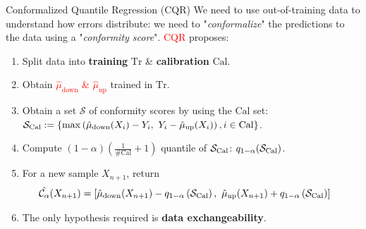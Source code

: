 \documentclass{beamer}
\newcommand{\Ca}{\mathcal{C}_{\alpha}}
\renewcommand{\S}{\mathcal{S}}
\renewcommand{\a}{\alpha}
\begin{document}
\begin{frame}{Conformalized Quantile Regression (CQR)}
    We need to use out-of-training data to understand how errors distribute: we need to "\textit{conformalize}" the predictions to the data using a "\textit{conformity score}".  \textcolor{red}{CQR} proposes:
    \begin{enumerate}
        \item Split data into \textbf{training} $\mathrm{Tr}$ \& \textbf{calibration} $\mathrm{Cal}$.
        \item Obtain \cancel{$\Hat{\mu}$} \textcolor{red}{$\hat{\mu}_{\mathrm{down}}$ \& $\hat{\mu}_{\mathrm{up}}$} trained in $\mathrm{Tr}$.
        \item Obtain a set $\S$ of conformity scores by using the $\mathrm{Cal}$ set: \textcolor{red}{$\S_{\rm{Cal}}:=\{ \mathrm{max}\left(\hat{\mu}_{\mathrm{down}}(X_i) - Y_i,\ Y_i - \hat{\mu}_{\mathrm{up}}(X_i)\right), i\in \mathrm{Cal}\}$}.
        \item Compute $(1-\a)\left(\frac{1}{\#\mathrm{Cal}}+1\right)$ quantile of $\S_{\rm{Cal}}$: $q_{1-\a}(\S_{\rm{Cal}})$.
        \item For a new sample $X_{n+1}$, return 
        \textcolor{red}{\begin{equation*}
            \label{eq:cqr}
            \hspace{-5mm}
            \Hat{\Ca}(X_{n+1}) = \left[\hat{\mu}_{\mathrm{down}}(X_{n+1}) - q_{1-\a}\left(\S_{\mathrm{Cal}}\right),\ \hat{\mu}_{\mathrm{up}}(X_{n+1}) + q_{1-\a}\left(\S_{\mathrm{Cal}}\right)\right]
        \end{equation*}}
        \item[] \vspace{-6mm}
        \begin{tcolorbox}[colback=red!5,colframe=red!40!black,title=Note]
            The only hypothesis required is \textbf{data exchangeability}.
        \end{tcolorbox}
    \end{enumerate}
\end{frame}

\end{document}
